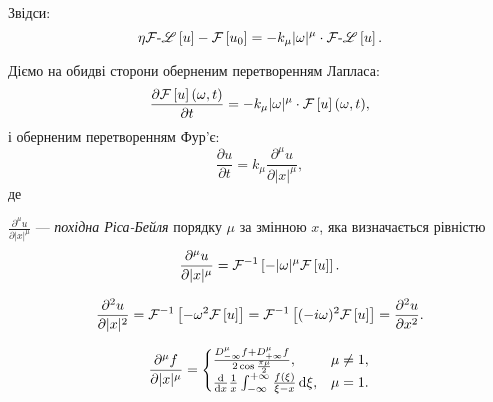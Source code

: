 Звідси:
\begin{equation}
    \eta \mathcal{F}\text{-}\mathscr{L}\left[u\right] - \mathcal{F}\left[u_0\right] = -k_\mu |\omega|^\mu \cdot \mathcal{F}\text{-}\mathscr{L}\left[u\right].
\end{equation}

Діємо на обидві сторони оберненим перетворенням Лапласа:
\begin{equation}
    \frac{\partial \mathcal{F}\left[u\right](\omega, t)}{\partial t} = -k_\mu |\omega|^\mu \cdot \mathcal{F}\left[u\right](\omega, t),
\end{equation}
і оберненим перетворенням Фур'є:
\begin{equation}
    \frac{\partial u}{\partial t} = k_\mu \frac{\partial^\mu u}{\partial |x|^\mu},
\end{equation}
де 
\begin{definition}
    $\frac{\partial^\mu u}{\partial |x|^\mu}$ --- \textit{похідна Ріса-Бейля} порядку $\mu$ за змінною $x$, яка визначається рівністю
    \begin{equation}
        \frac{\partial^\mu u}{\partial |x|^\mu} = \mathcal{F}^{-1}\left[-|\omega|^\mu \mathcal{F}\left[u\right]\right].
    \end{equation}
\end{definition}

\begin{remark}
    \begin{equation}
        \frac{\partial^2 u}{\partial |x|^2} = \mathcal{F}^{-1}\left[-\omega^2 \mathcal{F}\left[u\right]\right] = \mathcal{F}^{-1}\left[(-i \omega)^2 \mathcal{F}\left[u\right]\right] = \frac{\partial^2 u}{\partial x^2}.
    \end{equation}
\end{remark}

\begin{remark}
    \begin{equation}
        \frac{\partial^\mu f}{\partial |x|^\mu} = \begin{cases}
            \frac{D_{-\infty}^\mu f + D_{+\infty}^\mu f}{2 \cos \frac{\pi \mu}{2}}, & \mu \ne 1, \\
            \frac{\mathop{}\!\mathrm{d}}{\mathop{}\!\mathrm{d} x} \frac{1}{x} \int_{-\infty}^{+\infty} \frac{f(\xi)}{\xi - x} \mathop{}\!\mathrm{d} \xi, & \mu = 1.
        \end{cases}
    \end{equation}
\end{remark}


